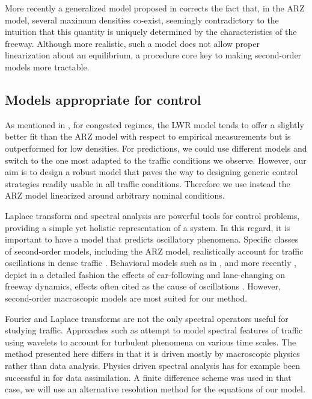 \documentclass[preprint]{elsarticle}
\begin{document}

More recently a generalized model proposed in \cite{Fan} corrects the fact that, in the ARZ model, several maximum densities co-exist, seemingly contradictory to the intuition that this quantity is uniquely determined by the characteristics of the freeway. Although more realistic, such a model does not allow proper linearization about an equilibrium, a procedure core key to making second-order models more tractable.

\subsection{Models appropriate for control}
As mentioned in \cite{Fan}, for congested regimes, the LWR model tends to offer a slightly better fit than the ARZ model with respect to empirical measurements but is outperformed for low densities. For predictions, we could use different models and switch to the one most adapted to the traffic conditions we observe. However, our aim is to design a robust model that paves the way to designing generic control strategies readily usable in all traffic conditions. Therefore we use instead the ARZ model linearized around arbitrary nominal conditions. 

Laplace transform and spectral analysis are powerful tools for control problems, providing a simple yet holistic representation of a system. In this regard, it is important to have a model that predicts oscillatory phenomena. Specific classes of second-order models, including the ARZ model, realistically account for traffic oscillations in dense traffic \cite{Greenberg_congestionredux}. Behavioral models such as in \cite{Newell}, and more recently \cite{Chen2012, Ge20129}, depict in a detailed fashion the effects of car-following
and lane-changing on freeway dynamics, effects often cited as the cause of oscillations \cite{Mauch02freewaytraffic, lanechangin2005,lanechanging2007}. However, second-order macroscopic models are most suited for our method. 

Fourier and Laplace transforms are not the only spectral operators useful for studying traffic. Approaches such as \cite{Zheng2011} attempt to model spectral features of traffic using wavelets to account for turbulent phenomena on various time scales. The method presented here differs in that it is driven mostly by macroscopic physics rather than data analysis. Physics driven spectral analysis has for example been successful in \cite{fourierGalerkin} for data assimilation. A finite difference scheme was used in that case, we will use an alternative resolution method for the equations of our model.
\end{document}

